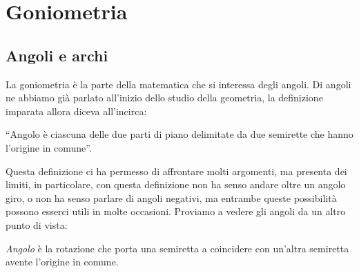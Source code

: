 


\chapter{Goniometria}

\section{Angoli e archi}
\label{sec:gonio_angoli_archi}

%  
%  
% 
%  

La goniometria è la parte della matematica che si interessa degli angoli. 
Di angoli ne abbiamo già parlato all'inizio dello studio della geometria, 
la definizione imparata allora diceva all'incirca:

``Angolo è ciascuna delle due parti di piano delimitate da due semirette
che hanno l'origine in comune''.

Questa definizione ci ha permesso di affrontare molti argomenti, ma presenta 
dei limiti, in particolare, con questa definizione non ha senso andare oltre
un angolo giro, o non ha senso parlare di angoli negativi, ma entrambe queste 
possibilità possono esserci utili in molte occasioni. 
Proviamo a vedere gli angoli da un altro punto di vista:

\begin{definizione}
 \emph{Angolo} è la rotazione che porta una semiretta a coincidere con 
un'altra 
 semiretta avente l'origine in comune.
\end{definizione}

